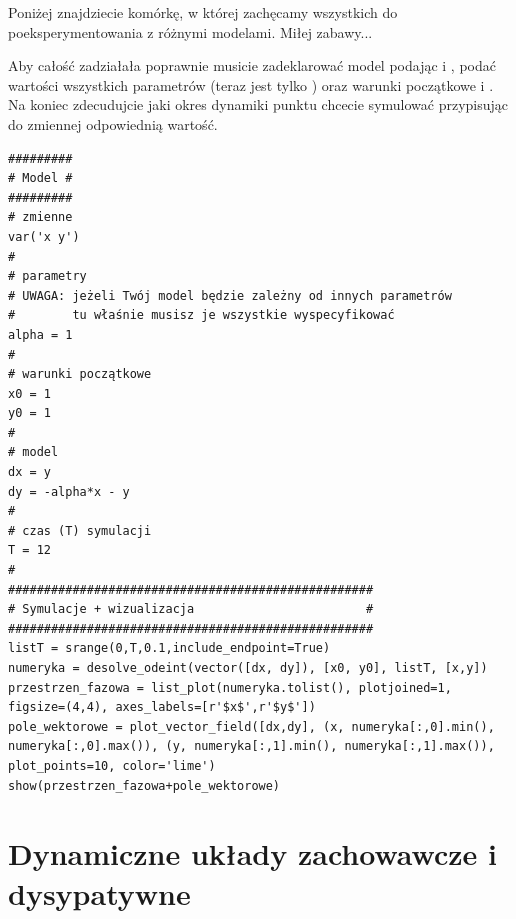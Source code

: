 \documentclass[a4paper,12pt,polish]{sphinxmanual}
\makeatletter
\renewenvironment{notice}[2]{\begin{icsebox}\def\py@noticetype{#1}\par\strong{#2}}{\end{icsebox}}\makeatother
\makeatother
\begin{document}
Poniżej znajdziecie komórkę, w której zachęcamy wszystkich do poeksperymentowania z różnymi modelami. Miłej zabawy...

\begin{notice}{tip}{Wskazówka:}
Aby całość zadziałała poprawnie musicie zadeklarować model podając  i ,
podać wartości wszystkich parametrów (teraz jest tylko )
oraz warunki początkowe  i .
Na koniec zdecudujcie jaki okres dynamiki punktu chcecie symulować
przypisując do zmiennej  odpowiednią wartość.
\end{notice}


\begin{verbatim}
#########
# Model #
#########
# zmienne
var('x y')
#
# parametry
# UWAGA: jeżeli Twój model będzie zależny od innych parametrów
#        tu właśnie musisz je wszystkie wyspecyfikować
alpha = 1
#
# warunki początkowe
x0 = 1
y0 = 1
#
# model
dx = y
dy = -alpha*x - y
#
# czas (T) symulacji
T = 12
#
###################################################
# Symulacje + wizualizacja                        #
###################################################
listT = srange(0,T,0.1,include_endpoint=True)
numeryka = desolve_odeint(vector([dx, dy]), [x0, y0], listT, [x,y])
przestrzen_fazowa = list_plot(numeryka.tolist(), plotjoined=1, figsize=(4,4), axes_labels=[r'$x$',r'$y$'])
pole_wektorowe = plot_vector_field([dx,dy], (x, numeryka[:,0].min(), numeryka[:,0].max()), (y, numeryka[:,1].min(), numeryka[:,1].max()), plot_points=10, color='lime')
show(przestrzen_fazowa+pole_wektorowe)
\end{verbatim}



\section{Dynamiczne układy zachowawcze i dysypatywne}
\label{ch1/chI022::doc}\label{ch1/chI022:dynamiczne-uklady-zachowawcze-i-dysypatywne}
\end{document}
